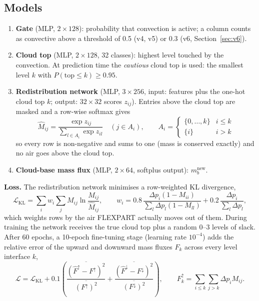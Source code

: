 \documentclass[11pt,a4paper]{article}
\begin{document}
\subsection{Models}
\begin{enumerate}
\item \textbf{Gate} (MLP, $2\times128$): probability that convection is active; a column counts as
convective above a threshold of 0.5 (v4, v5) or 0.3 (v6, Section~\ref{sec:v6}).
\item \textbf{Cloud top} (MLP, $2\times128$, 32 classes): highest level touched by the convection. At
prediction time the \emph{cautious} cloud top is used: the smallest level $k$ with
$P(\text{top}\le k)\ge 0.95$.
\item \textbf{Redistribution network} (MLP, $3\times256$, input: features plus the one-hot cloud top
$k$; output: $32\times32$ scores $z_{ij}$). Entries above the cloud top are masked and a row-wise
softmax gives
\begin{equation}
\hat M_{ij} = \frac{\exp z_{ij}}{\sum_{l \in A_i} \exp z_{il}}\quad (j \in A_i), \qquad
A_i = \begin{cases}\{0,\dots,k\} & i \le k\\ \{i\} & i > k\end{cases}
\end{equation}
so every row is non-negative and sums to one (mass is conserved exactly) and no air goes above the
cloud top.
\item \textbf{Cloud-base mass flux} (MLP, $2\times64$, softplus output): $m_b^{\text{new}}$.
\end{enumerate}

\textbf{Loss.} The redistribution network minimises a row-weighted KL divergence,
\begin{equation}
\mathcal{L}_{\text{KL}} = \sum_i w_i \sum_j M_{ij}\ln\frac{M_{ij}}{\hat M_{ij}},\qquad
w_i = 0.8\,\frac{\Delta p_i(1-M_{ii})}{\sum_l \Delta p_l(1-M_{ll})} + 0.2\,\frac{\Delta p_i}{\sum_l \Delta p_l},
\end{equation}
which weights rows by the air FLEXPART actually moves out of them. During training the network
receives the true cloud top plus a random 0--3 levels of slack. After 60 epochs, a 10-epoch
fine-tuning stage (learning rate $10^{-4}$) adds the relative error of the upward and downward mass
fluxes $F_k$ across every level interface $k$,
\begin{equation}
\mathcal{L} = \mathcal{L}_{\text{KL}} + 0.1\left(\frac{\overline{(\hat F^{\uparrow}-F^{\uparrow})^2}}{\overline{(F^{\uparrow})^2}}
+ \frac{\overline{(\hat F^{\downarrow}-F^{\downarrow})^2}}{\overline{(F^{\downarrow})^2}}\right),
\qquad F^{\uparrow}_k = \sum_{i\le k}\sum_{j>k}\Delta p_i M_{ij}.
\end{equation}
\end{document}
